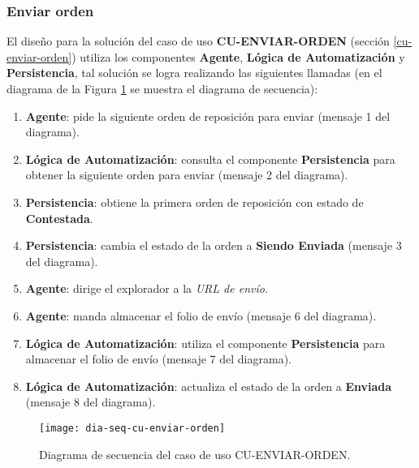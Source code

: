 \subsubsection{Enviar orden}
El diseño para la solución del caso de uso \textbf{CU-ENVIAR-ORDEN} (sección \ref{cu-enviar-orden}) utiliza los componentes \textbf{Agente}, \textbf{Lógica de Automatización} y \textbf{Persistencia}, tal solución se logra realizando las siguientes llamadas (en el diagrama de la Figura \ref{fig:dia-seq-cu-enviar-orden} se muestra el diagrama de secuencia):
\begin{enumerate}
	\item \textbf{Agente}: pide la siguiente orden de reposición para enviar (mensaje 1 del diagrama).
	\item \textbf{Lógica de Automatización}: consulta el componente \textbf{Persistencia} para obtener la siguiente orden para enviar (mensaje 2 del diagrama).
	\item \textbf{Persistencia}: obtiene la primera orden de reposición con estado de \textbf{Contestada}.
	\item \textbf{Persistencia}: cambia el estado de la orden a \textbf{Siendo Enviada} (mensaje 3 del diagrama).
	\item \textbf{Agente}: dirige el explorador a la \textit{URL de envío}.
	\item \textbf{Agente}: manda almacenar el folio de envío (mensaje 6 del diagrama).
	\item \textbf{Lógica de Automatización}: utiliza el componente \textbf{Persistencia} para almacenar el folio de envío (mensaje 7 del diagrama).
	\item \textbf{Lógica de Automatización}: actualiza el estado de la orden a \textbf{Enviada} (mensaje 8 del diagrama).
\end{enumerate}

\begin{figure}[h]
	\centering
	\texttt{[image: dia-seq-cu-enviar-orden]}
	\caption{Diagrama de secuencia del caso de uso CU-ENVIAR-ORDEN.}
	\label{fig:dia-seq-cu-enviar-orden}
\end{figure}

